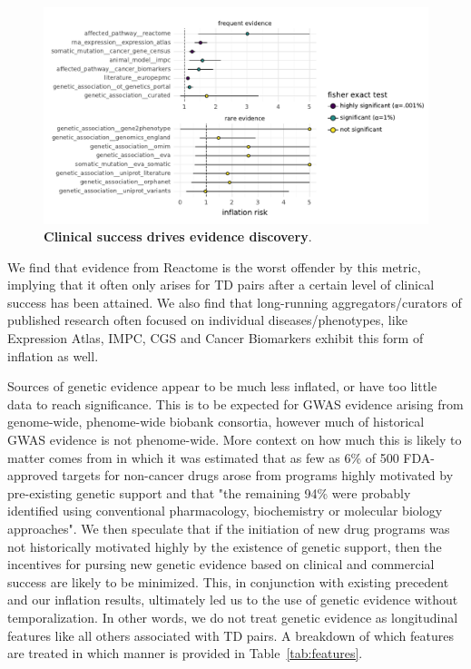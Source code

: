 \documentclass{article}
\begin{document}
\begin{figure}[!htb]
  \centering
  \captionsetup{width=.9\linewidth}
  \includegraphics[width=1\textwidth]{evidence_inflation.pdf}
  \caption{
    \textbf{Clinical success drives evidence discovery}.  
  }
  \label{fig:evidence_inflation}
\end{figure}

We find that evidence from Reactome is the worst offender by this metric, implying that it often only arises for TD pairs after a certain level of clinical success has been attained. We also find that long-running aggregators/curators of published research often focused on individual diseases/phenotypes, like Expression Atlas, IMPC, CGS and Cancer Biomarkers exhibit this form of inflation as well.

Sources of genetic evidence appear to be much less inflated, or have too little data to reach significance. This is to be expected for GWAS evidence arising from genome-wide, phenome-wide biobank consortia, however much of historical GWAS evidence is not phenome-wide. More context on how much this is likely to matter comes from \cite{PMID:37612393} in which it was estimated that as few as 6\% of 500 FDA-approved targets for non-cancer drugs arose from programs highly motivated by pre-existing genetic support and that "the remaining 94\% were probably identified using conventional pharmacology, biochemistry or molecular biology approaches". We then speculate that if the initiation of new drug programs was not historically motivated highly by the existence of genetic support, then the incentives for pursing new genetic evidence based on clinical and commercial success are likely to be minimized. This, in conjunction with existing precedent \cite{Nelson2015-eg,King2019-rc,Minikel2023.06.23.23291765,Razuvayevskaya2023.02.07.23285407,PMID:30652614,PMID:35804044} and our inflation results, ultimately led us to the use of genetic evidence without temporalization. In other words, we do not treat genetic evidence as longitudinal features like all others associated with TD pairs. A breakdown of which features are treated in which manner is provided in Table~\ref{tab:features}.
\end{document}
